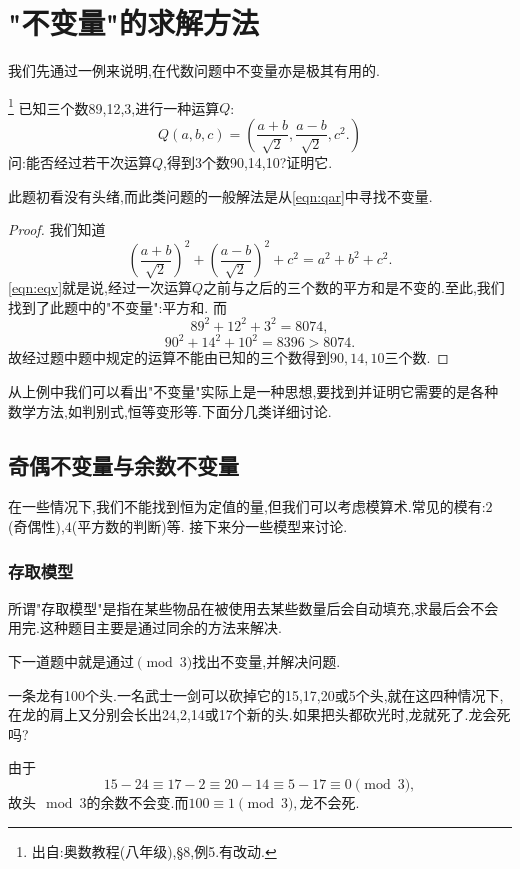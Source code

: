 \section{"不变量"的求解方法}
\label{sect2}

我们先通过一例来说明,在代数问题中不变量亦是极其有用的.
\begin{problem}\footnote{出自:奥数教程(八年级),\S{8},例5.有改动.}
    已知三个数89,12,3,进行一种运算$Q$:\label{pbl:qar}
    \begin{equation}
        Q(a,b,c)=(\dfrac{a+b}{\sqrt{2}},\dfrac{a-b}{\sqrt{2}},c^2.)\label{eqn:qar}
    \end{equation}
    问:能否经过若干次运算$Q$,得到3个数90,14,10?证明它.
\end{problem}
此题初看没有头绪,而此类问题的一般解法是从\eqref{eqn:qar}中寻找不变量.
\begin{proof}
    \songti 我们知道
    \begin{equation}
        \left(\dfrac{a+b}{\sqrt{2}}\right)^2+\left(\dfrac{a-b}{\sqrt{2}}\right)^2+c^2=a^2+b^2+c^2.\label{eqn:eqv}
    \end{equation}
    \eqref{eqn:eqv}就是说,经过一次运算$Q$之前与之后的三个数的平方和是不变的.至此,我们找到了此题中的"不变量":平方和.
    而$${89}^2+12^2+3^2=8074,$$
    $$90^2+14^2+10^2=8396>8074.$$
    故经过题中题中规定的运算不能由已知的三个数得到$90,14,10$三个数.
\end{proof}
从上例中我们可以看出"不变量"实际上是一种思想,要找到并证明它需要的是各种数学方法,如判别式,恒等变形等.下面分几类详细讨论.
\subsection{奇偶不变量与余数不变量}
在一些情况下,我们不能找到恒为定值的量,但我们可以考虑模算术.常见的模有:$2$(奇偶性),$4$(平方数的判断)等.
接下来分一些模型来讨论.
\subsubsection{存取模型}
所谓"存取模型"是指在某些物品在被使用去某些数量后会自动填充,求最后会不会用完.这种题目主要是通过同余的方法来解决.

下一道题中就是通过$\pmod 3$找出不变量,并解决问题.
\begin{problem}
    一条龙有100个头.一名武士一剑可以砍掉它的15,17,20或5个头,就在这四种情况下,在龙的肩上又分别会长出24,2,14或17个新的头.如果把头都砍光时,龙就死了.龙会死吗?
\end{problem}
\begin{solution}
    \songti
    由于$$15-24\equiv 17-2\equiv 20-14\equiv 5-17\equiv 0\pmod3,$$故头$\mod 3$的余数不会变.而$100\equiv 1\pmod3,$龙不会死.
\end{solution}
